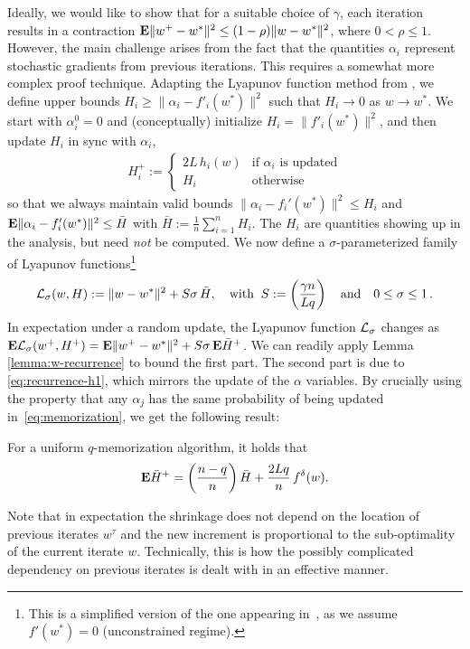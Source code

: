 Ideally, we would like to show that for a suitable choice of $\gamma$, each iteration results in a contraction  ${\mathbf E} \| w^+ - w^*\|^2 \le (1-\rho) \| w - w^*\|^2$, where $0 < \rho \leq 1$. However, the main challenge arises from the fact that the quantities $\alpha_i$ represent stochastic gradients from previous iterations. This requires a somewhat more complex proof technique. Adapting the Lyapunov function method from \cite{defazio2014}, we  define upper bounds $H_i \geq \| \alpha_i - f'_i(w^*)\|^2$ such that $H_i \to 0$ as $w \to w^*$. We start with $\alpha^0_i\!=\!0$ and (conceptually) initialize $H_i = \|f'_i(w^*)\|^2$, and then update $H_i$ in sync with $\alpha_i$,
%
\begin{align}
H_i^+ := 
\begin{cases}
2L \, h_i(w) & \text{if $\alpha_i$ is updated} \\
H_i & \text{otherwise}
\end{cases} 
\label{eq:recurrence-h1}
\end{align} 
so that we always maintain valid bounds $\| \alpha_i - f_i'(w^*) \|^2 \le H_i$ and ${\mathbf E}\| \alpha_i - f_i'(w^*) \|^2 \le \bar H$ with $\bar H := \frac 1n \sum_{i=1}^n H_i$. The $H_i$ are quantities showing up in the analysis, but need  \textit{not} be computed. We now define a $\sigma$-parameterized family of Lyapunov functions\footnote{This is a simplified version of the one appearing in~\cite{defazio2014}, as we assume $f'(w^*)=0$ (unconstrained regime).}
\begin{align} \label{eq:lyapunov_fct}
{\mathcal L}_\sigma(w,H) := \| w- w^*\|^2 + S \sigma \,  \bar H, 
\quad \text{with} \; \; S:= \left( \frac{\gamma n}{L q} \right) \quad \text{and}\quad  0\leq  \sigma \leq 1\,.
\end{align}
In expectation under a random update, the Lyapunov function ${\mathcal L}_\sigma$ changes as $ {\mathbf E} {\mathcal L}_\sigma(w^+,H^+)  = {\mathbf E} \| w^+ - w^*\|^2  + S \sigma\, {\mathbf E} \bar H^+$. 
%
We can readily apply Lemma \ref{lemma:w-recurrence} to bound the first part. The second part is due to \eqref{eq:recurrence-h1}, which mirrors the update of the $\alpha$ variables.  
By crucially using the property that any $\alpha_j$ has the same probability of being updated in~\eqref{eq:memorization}, we
get the following result: 
\begin{lemma} 
For a uniform $q$-memorization algorithm, it holds that 
\begin{align}
{\mathbf E} \bar H^+ = \left( \frac{n-q}{n} \right) \bar H + \frac{2Lq}{n} \, f^\delta(w) .
\label{eq:h-recurrence}
\end{align}
\label{lemma:hrecurrence2}
\end{lemma}
\vspace{-3.5mm}
Note that in expectation the shrinkage does not depend on the location of previous iterates $w^\tau$ and the new increment is  proportional to the sub-optimality of the current iterate $w$.  Technically, this is how the possibly complicated dependency on previous iterates is dealt with in an effective manner. 

